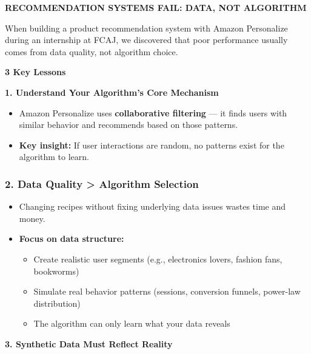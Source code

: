 \vspace{0.5em}\noindent\textbf{RECOMMENDATION SYSTEMS FAIL: DATA, NOT
ALGORITHM}\par

When building a product recommendation system with Amazon Personalize
during an internship at FCAJ, we discovered that poor performance
usually comes from data quality, not algorithm choice.

\vspace{0.5em}\noindent\textbf{3 Key Lessons}\par

\vspace{0.5em}\noindent\textbf{1. Understand Your Algorithm's Core
Mechanism}\par

\begin{itemize}
\tightlist
\item
  Amazon Personalize uses \textbf{collaborative filtering} --- it finds
  users with similar behavior and recommends based on those patterns.
\item
  \textbf{Key insight:} If user interactions are random, no patterns
  exist for the algorithm to learn.
\end{itemize}

\subsubsection{2. Data Quality \textgreater{} Algorithm
Selection}

\begin{itemize}
\tightlist
\item
  Changing recipes without fixing underlying data issues wastes time and
  money.
\item
  \textbf{Focus on data structure:}

  \begin{itemize}
  \tightlist
  \item
    Create realistic user segments (e.g., electronics lovers, fashion
    fans, bookworms)
  \item
    Simulate real behavior patterns (sessions, conversion funnels,
    power-law distribution)
  \item
    The algorithm can only learn what your data reveals
  \end{itemize}
\end{itemize}

\vspace{0.5em}\noindent\textbf{3. Synthetic Data Must Reflect
Reality}\par

